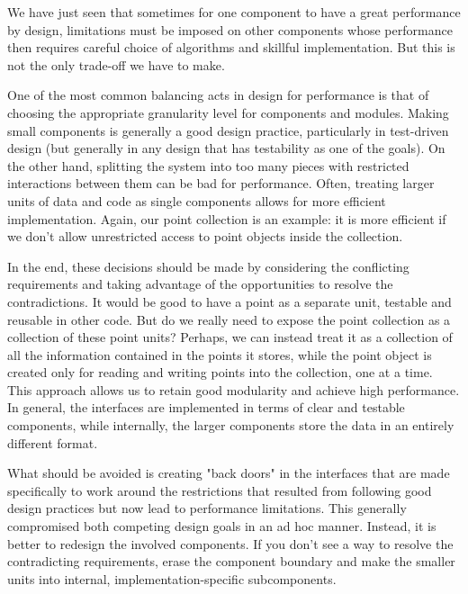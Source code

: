 
We have just seen that sometimes for one component to have a great performance by design, limitations must be imposed on other components whose performance then requires careful choice of algorithms and skillful implementation. But this is not the only trade-off we have to make. 

One of the most common balancing acts in design for performance is that of choosing the appropriate granularity level for components and modules. Making small components is generally a good design practice, particularly in test-driven design (but generally in any design that has testability as one of the goals). On the other hand, splitting the system into too many pieces with restricted interactions between them can be bad for performance. Often, treating larger units of data and code as single components allows for more efficient implementation. Again, our point collection is an example: it is more efficient if we don't allow unrestricted access to point objects inside the collection. 

In the end, these decisions should be made by considering the conflicting requirements and taking advantage of the opportunities to resolve the contradictions. It would be good to have a point as a separate unit, testable and reusable in other code. But do we really need to expose the point collection as a collection of these point units? Perhaps, we can instead treat it as a collection of all the information contained in the points it stores, while the point object is created only for reading and writing points into the collection, one at a time. This approach allows us to retain good modularity and achieve high performance. In general, the interfaces are implemented in terms of clear and testable components, while internally, the larger components store the data in an entirely different format. 

What should be avoided is creating "back doors" in the interfaces that are made specifically to work around the restrictions that resulted from following good design practices but now lead to performance limitations. This generally compromised both competing design goals in an ad hoc manner. Instead, it is better to redesign the involved components. If you don't see a way to resolve the contradicting requirements, erase the component boundary and make the smaller units into internal, implementation-specific subcomponents.

